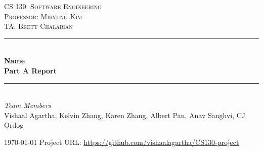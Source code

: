 \documentclass[11pt]{article}
\begin{document}
\begin{titlepage} 
	\newcommand{\HRule}{\rule{\linewidth}{0.5mm}} 
	
	\center 
	
	\textsc{\LARGE CS 130: Software Engineering}\\[1.5cm] 
	
	\textsc{\Large Professor: Miryung Kim}\\[0.5cm] 
	
	\textsc{\large TA: Brett Chalabian}\\[0.5cm] 
	

	
	\HRule\\[0.4cm]
	
	{\huge\bfseries Name}\\[0.4cm] %
	{\huge\bfseries Part A Report}\\[0.4cm]
	\HRule\\[1.5cm]
	

	
			\large
			\textit{Team Members}\\
			Vishaal Agartha, Kelvin Zhang, Karen Zhang, Albert Pan, Anav Sanghvi, CJ Ordog

	

	
	\vfill\vfill\vfill 
	
	{\large\today} 
	\vfill
	Project URL:  \url{https://github.com/vishaalagartha/CS130-project}

	 
	
	\vfill 
	
\end{titlepage}
\end{document}
